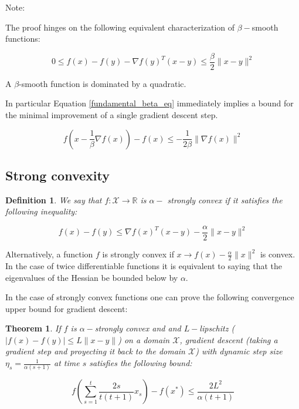 \documentclass{article}
\newtheorem{theorem}{Theorem}
\newtheorem{definition}{Definition}
\begin{document}
Note:

The proof hinges on the following equivalent characterization of $\beta-$smooth functions:

\begin{equation}\label{fundamental_beta_eq}
0 \leq f(x) - f(y) - \nabla f(y)^T(x-y) \leq \frac{\beta}{2} \parallel x - y \parallel^2
\end{equation}

A $\beta$-smooth function is dominated by a quadratic. 

In particular Equation \ref{fundamental_beta_eq} immediately implies a bound for the minimal improvement of a single gradient descent step.

\begin{equation}
f(x- \frac{1}{\beta} \nabla f(x) ) - f(x) \leq -\frac{1}{2\beta} \parallel \nabla f(x) \parallel^2
\end{equation}










\subsection{Strong convexity}

\begin{definition}
We say that $f: \mathcal{X} \rightarrow \mathbb{R}$ is $\alpha-$ strongly convex if it satisfies the following inequality:

\begin{equation}
f(x) - f(y) \leq \nabla f(x)^T (x-y) - \frac{\alpha}{2} \parallel x -y \parallel^2
\end{equation}

\end{definition}

Alternatively, a function $f$ is strongly convex if $x \rightarrow f(x) - \frac{\alpha}{2}\parallel x \parallel^2$ is convex. In the case of twice differentiable functions it is equivalent to saying that the eigenvalues of the Hessian be bounded below by $\alpha$. 

In the case of strongly convex functions one can prove the following convergence upper bound for gradient descent:

\begin{theorem}
If $f$ is $\alpha-$strongly convex and and $L-$lipschitz ($|f(x) - f(y)| \leq L \parallel x - y\parallel $) on a domain $\mathcal{X}$, gradient descent (taking a gradient step and proyecting it back to the domain $\mathcal{X}$) with dynamic step size $\eta_s = \frac{1}{\alpha(s+1)}$ at time $s$ satisfies the following bound:

\begin{equation}
f\left(\sum_{s=1}^t \frac{2s}{t(t+1)} x_s \right) - f(x^*) \leq \frac{2L^2}{\alpha (t+1)}
\end{equation}

\end{theorem}
\end{document}

